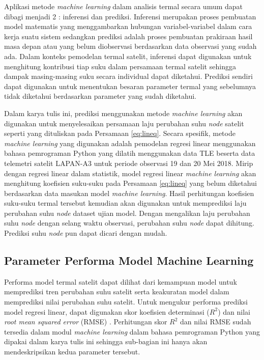 Aplikasi metode \textit{machine learning} dalam analisis termal secara umum
dapat dibagi menjadi 2 : inferensi dan prediksi. Inferensi merupakan proses
pembuatan model matematis yang menggambarkan hubungan variabel-variabel dalam
cara kerja suatu sistem sedangkan prediksi adalah proses pembuatan prakiraan
hasil masa depan atau yang belum diobservasi berdasarkan data observasi yang
sudah ada. Dalam konteks pemodelan termal satelit, inferensi dapat digunakan
untuk menghitung kontribusi tiap suku dalam persamaan termal satelit sehingga
dampak masing-masing suku secara individual dapat diketahui. Prediksi sendiri
dapat digunakan untuk menentukan besaran parameter termal yang
sebelumnya tidak diketahui berdasarkan parameter yang sudah
diketahui.

Dalam karya tulis ini, prediksi menggunakan metode \textit{machine learning}
akan digunakan untuk menyelesaikan persamaan laju perubahan suhu \textit{node}
satelit seperti yang dituliskan pada Persamaan \ref{eq:lineq}. Secara spesifik,
metode \textit{machine learning} yang digunakan adalah pemodelan regresi linear
menggunakan bahasa pemrograman Python yang dilatih menggunakan data TLE beserta
data telemetri satelit LAPAN-A3 untuk periode observasi 19 dan 20 Mei 2018.
Mirip dengan regresi linear dalam statistik, model regresi linear
\textit{machine learning} akan menghitung koefisien suku-suku pada Persamaan
\ref{eq:lineq} yang belum diketahui berdasarkan data masukan model
\textit{machine learning}. Hasil perhitungan koefisien suku-suku termal
tersebut kemudian akan digunakan untuk memprediksi laju perubahan suhu \textit{node}
dataset ujian model. Dengan mengalikan laju perubahan suhu \textit{node} dengan
selang waktu observasi, perubahan suhu \textit{node} dapat dihitung. Prediksi
suhu \textit{node} pun dapat dicari dengan mudah.

\subsection{Parameter Performa Model Machine Learning}

Performa model termal satelit dapat dilihat dari kemampuan model untuk
memprediksi tren perubahan suhu satelit serta keakuratan model dalam
memprediksi nilai perubahan suhu satelit. Untuk mengukur performa prediksi
model regresi linear, dapat digunakan skor koefisien determinasi ($R^2$) dan
nilai \textit{root mean squared error} (RMSE) \cite{boschetti2015}. Perhitungan
skor $R^2$ dan nilai RMSE sudah tersedia dalam modul \textit{machine learning}
dalam bahasa pemrograman Python yang dipakai dalam karya tulis ini sehingga
sub-bagian ini hanya akan mendeskripsikan kedua parameter tersebut.

